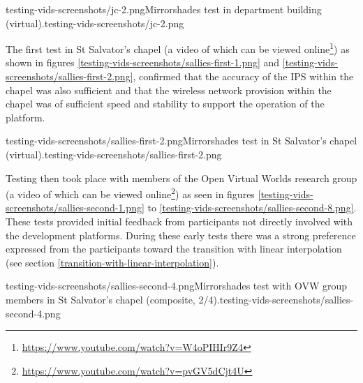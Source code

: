        {testing-vids-screenshots/jc-2.png}{Mirrorshades test in department building (virtual).}{testing-vids-screenshots/jc-2.png}


The first test in St Salvator's chapel (a video of which can be viewed online\footnote{\url{https://www.youtube.com/watch?v=W4oPIHIr9Z4}}) as shown in figures \ref{testing-vids-screenshots/sallies-first-1.png} and \ref{testing-vids-screenshots/sallies-first-2.png}, confirmed that the accuracy of the IPS within the chapel was also sufficient and that the wireless network provision within the chapel was of sufficient speed and stability to support the operation of the platform.

       {testing-vids-screenshots/sallies-first-2.png}{Mirrorshades test in St Salvator's chapel (virtual).}{testing-vids-screenshots/sallies-first-2.png}

Testing then took place with members of the Open Virtual Worlds research group (a video of which can be viewed online\footnote{\url{https://www.youtube.com/watch?v=pvGV5dCjt4U}}) as seen in figures \ref{testing-vids-screenshots/sallies-second-1.png} to \ref{testing-vids-screenshots/sallies-second-8.png}. These tests provided initial feedback from participants not directly involved with the development platforms. During these early tests there was a strong preference expressed from the participants toward the transition with linear interpolation (see section \ref{transition-with-linear-interpolation}).

       {testing-vids-screenshots/sallies-second-4.png}{Mirrorshades test with OVW group members in St Salvator's chapel (composite, 2/4).}{testing-vids-screenshots/sallies-second-4.png}


